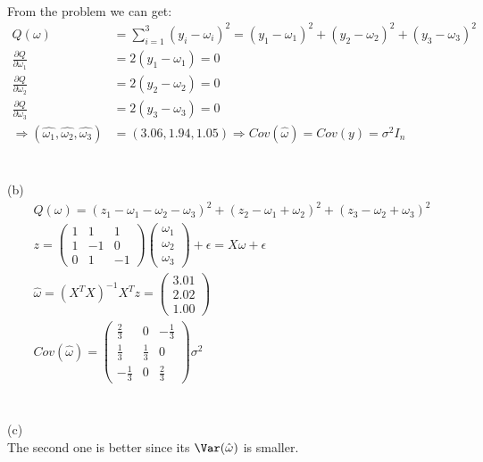 \documentclass[11pt]{article}
\begin{document}
  \paragraph{\color{red}{Question Four Answer:}}
  From the problem we can get: \\
    \begin{align*}
      Q(\omega) &= \sum_{i=1}^3(y_i - \omega_i)^2 = (y_1 - \omega_1)^2 + (y_2 - \omega_2)^2 + (y_3 - \omega_3)^2 \\
      \frac{\partial Q}{\partial \omega_1} &= 2(y_1 - \omega_1) = 0 \\
      \frac{\partial Q}{\partial \omega_2} &= 2(y_2 - \omega_2) = 0 \\
      \frac{\partial Q}{\partial \omega_3} &= 2(y_3 - \omega_3) = 0 \\
      \Rightarrow (\hat{\omega_1},\hat{\omega_2},\hat{\omega_3}) &= (3.06,1.94,1.05) \Rightarrow Cov(\hat{\omega})= Cov(y) = \sigma^2 I_n
    \end{align*}
  \\
  \\
  (b) \\
  \begin{align*}
    Q(\omega) = (z_1 - \omega_1 - \omega_2 - \omega_3 )^2 + (z_2 - \omega_1 + \omega_2)^2 + (z_3 - \omega_2 + \omega_3)^2 \\
    z =
      \begin{pmatrix}
        1 & 1 & 1\\
        1 & -1 & 0 \\
        0 & 1 & -1
      \end{pmatrix}
      \begin{pmatrix}
        \omega_1 \\ \omega_2 \\ \omega_3
      \end{pmatrix}
      + \epsilon = X\omega + \epsilon \\
      \hat{\omega} = (X^TX)^{-1}X^T z =
      \begin{pmatrix}
        3.01 \\ 2.02 \\ 1.00
      \end{pmatrix} \\
      Cov(\hat{\omega}) =
      \begin{pmatrix}
        \frac{2}{3} & 0 &  -\frac{1}{3} \\
        \frac{1}{3} & \frac{1}{3} & 0 \\
        -\frac{1}{3} & 0 & \frac{2}{3}
      \end{pmatrix}
      \sigma^2
  \end{align*}
  \\
  \\
  (c) \\
  The second one is  better since its $\Var(\hat{\omega})$ is smaller.
  \\
\end{document}
